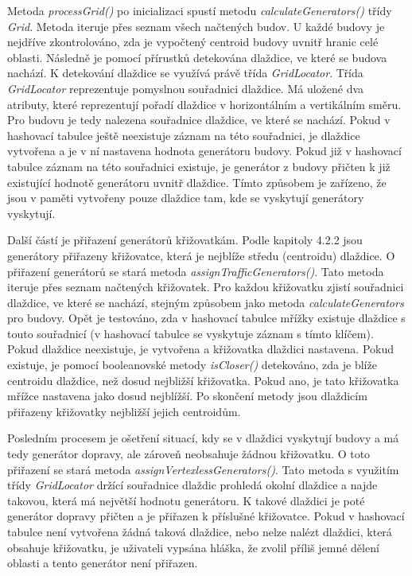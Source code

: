 Metoda \textit{processGrid()} po inicializaci spustí metodu \textit{calculateGenerators()} třídy \textit{Grid}. Metoda iteruje přes seznam všech načtených budov. U každé budovy je nejdříve zkontrolováno, zda je vypočtený centroid budovy uvnitř hranic celé oblasti. Následně je pomocí přírustků detekována dlaždice, ve které se budova nachází. K detekování dlaždice se využívá právě třída \textit{GridLocator}. Třída \textit{GridLocator} reprezentuje pomyslnou souřadnici dlaždice. Má uložené dva atributy, které reprezentují pořadí dlaždice v horizontálním a vertikálním směru. Pro budovu je tedy nalezena souřadnice dlaždice, ve které se nachází. Pokud v hashovací tabulce ještě neexistuje záznam na této souřadnici, je dlaždice vytvořena a je v ní nastavena hodnota generátoru budovy. Pokud již v hashovací tabulce záznam na této souřadnici existuje, je generátor z budovy přičten k již existující hodnotě generátoru uvnitř dlaždice. Tímto způsobem je zařízeno, že jsou v paměti vytvořeny pouze dlaždice tam, kde se vyskytují generátory vyskytují. 

Další částí je přiřazení generátorů křižovatkám. Podle kapitoly 4.2.2 jsou generátory přiřazeny křižovatce, která je nejblíže středu (centroidu) dlaždice. O přiřazení generátorů se stará metoda \textit{assignTrafficGenerators()}. Tato metoda iteruje přes seznam načtených křižovatek. Pro každou křižovatku zjistí souřadnici dlaždice, ve které se nachází, stejným způsobem jako metoda \textit{calculateGenerators} pro budovy. Opět je testováno, zda v hashovací tabulce mřížky existuje dlaždice s touto souřadnicí (v hashovací tabulce se vyskytuje záznam s tímto klíčem). Pokud dlaždice neexistuje, je vytvořena a křižovatka dlaždici nastavena. Pokud existuje, je pomocí booleanovské metody \textit{isCloser()} detekováno, zda je blíže centroidu dlaždice, než dosud nejbližší křižovatka. Pokud ano, je tato křižovatka mřížce nastavena jako dosud nejblížší. Po skončení metody jsou dlaždicím přiřazeny křižovatky nejbližší jejich centroidům. 

Posledním procesem je ošetření situací, kdy se v dlaždici vyskytují budovy a má tedy generátor dopravy, ale zároveň neobsahuje žádnou křižovatku. O toto přiřazení se stará metoda \textit{assignVertexlessGenerators()}. Tato metoda s využitím třídy \textit{GridLocator} držící souřadnice dlaždic prohledá okolní dlaždice a najde takovou, která má největší hodnotu generátoru. K takové dlaždici je poté generátor dopravy přičten a je přiřazen k příslušné křižovatce. Pokud v hashovací tabulce není vytvořena žádná taková dlaždice, nebo nelze nalézt dlaždici, která obsahuje křižovatku, je uživateli vypsána hláška, že zvolil příliš jemné dělení oblasti a tento generátor není přiřazen. 

